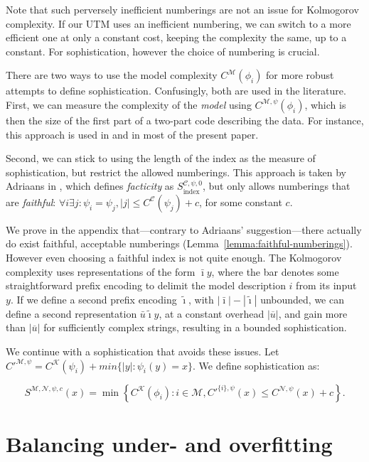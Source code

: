 \documentclass{style/llncs}
\newcommand{\M}{\mathscr M}
\newcommand{\C}{\mathscr C}
\newcommand{\K}{\mathscr K}
\newcommand{\Nm}{\mathscr N}
\newcommand{\br}[1]{\overline{#1}}
\newcommand{\s}{S}
\begin{document}
Note that such perversely inefficient numberings are not an issue for Kolmogorov complexity. If our UTM uses an inefficient numbering, we can switch to a more efficient one at only a constant cost, keeping the complexity the same, up to a constant. For sophistication, however the choice of numbering is crucial.

There are two ways to use the model complexity $C^\M(\phi_i)$ for more robust attempts to define sophistication. Confusingly, both are used in the literature. First, we can measure the complexity of the \emph{model} using $C^{\M,\psi}(\phi_i)$, which is then the size of the first part of a two-part code describing the data. For instance, this approach is used in  \cite{cover1985kolmogorov,gacs2001algorithmic,vitanyi2004meaningful,gellmann1996information} and in most of the present paper.

Second, we can stick to using the length of the index as the measure of sophistication, but restrict the allowed numberings. This approach is taken by Adriaans in \cite{adriaans2012facticity}, which defines \emph{facticity} as $\s_\text{index}^{\C,\psi,0}$, but only allows numberings that are \emph{faithful}: $\forall i \exists j : \psi_i=\psi_j, |j|\le C^{\C}(\psi_j)+c$, for some constant $c$.

We prove in the appendix that---contrary to Adriaans' suggestion---there actually do exist faithful, acceptable numberings (Lemma~\ref{lemma:faithful-numberings}). However even choosing a faithful index is not quite enough. The Kolmogorov complexity uses representations of the form $\bar\imath y$, where the bar denotes some straightforward prefix encoding to delimit the model description $i$ from its input $y$. If we define a second prefix encoding $\tilde{\imath}$, with $|\bar\imath|-|\tilde\imath|$ unbounded, we can define a second representation $\bar u \tilde \imath y$, at a constant overhead $|\br{u}|$, and gain more than $|\br{u}|$ for sufficiently complex strings, resulting in a bounded sophistication.

We continue with a sophistication that avoids these issues. Let $C'^{\M, \psi} = C^\K(\psi_i) + min\{|y| : \psi_i(y) = x\}$. We define sophistication as:

\begin{definition}[Sophistication]
\[
\s^{\M,\Nm,\psi,c}(x)=\min\left\{C^\K(\phi_i):i\in\M,C'^{\{i\},\psi}(x)\le C^{\Nm,\psi}(x)+c\right\}.
\]
\end{definition}

\section{Balancing under- and overfitting}
\label{section:balance}
\end{document}
